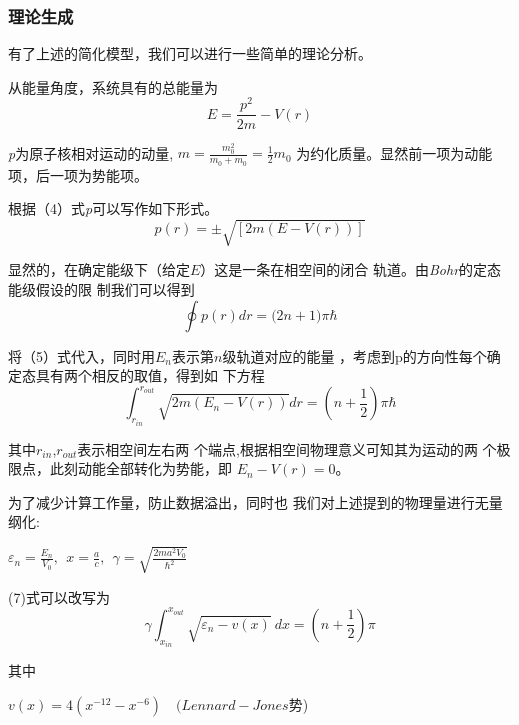 \documentclass[11pt, a4paper, oneside]{ctexart}
\begin{document}
{{{\subsubsection{理论生成}
{
    有了上述的简化模型，我们可以进行一些简单的理论分析。

    从能量角度，系统具有的总能量为
\begin{equation}
E=\frac {p^2}{2m}-V(r)
\end{equation}


    \emph{p}为原子核相对运动的动量,
    $m=\frac{m_0^2}{m_0+m_0}=\frac{1}{2}m_0$
    为约化质量。显然前一项为动能项，后一项为势能项。

    根据（4）式\emph{p}可以写作如下形式。
    \begin{equation}
        p(r)=\pm\sqrt{[2m(E-V(r))]}
    \end{equation}

    显然的，在确定能级下（给定$E$）这是一条在相空间的闭合
    轨道。由{\emph{Bohr}的定态能级假设}的限
    制我们可以得到
    \begin{equation}
        \oint p(r)dr=({2n+1)}\pi \hbar
    \end{equation}
    
    将（5）式代入，同时用$E_n$表示第$n$级轨道对应的能量
    ，考虑到p的方向性每个确定态具有两个相反的取值，得到如
    下方程
    \begin{equation}
        \int^{r_{out}}_{r_{in}}\sqrt{2m(E_n-V(r))}dr=(n+\frac{1}{2})\pi\hbar
    \end{equation}

    其中$r_{in}$,$r_{out}$表示相空间左右两
    个端点,根据相空间物理意义可知其为运动的两
    个极限点，此刻动能全部转化为势能，即
    $E_n-V(r)=0$。

    为了减少计算工作量，防止数据溢出，同时也
    我们对上述提到的物理量进行无量纲化:

    \begin{center}
        {$\varepsilon_n =\frac{E_n}{V_0},\ \ x=\frac a c ,\ \ \gamma=\sqrt{\frac{2ma^2V_0}{\hbar^2}}$}
    \end{center}

    
    (7)式可以改写为
    \begin{equation}
        \gamma \int ^{x_{out}} _{x_{in}}\sqrt{\varepsilon_n-v(x)}\ dx=(n+\frac 1 2 )\pi
    \end{equation}

    其中
    \begin{center}
        $v(x)=4(x^{-12}-x^{-6})\quad (Lennard −Jones $势)\end{center}
        
}}}}
\end{document}
